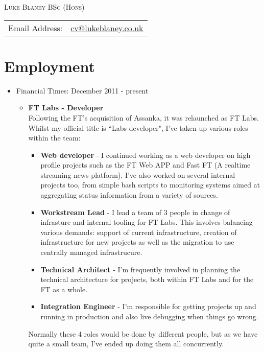 \documentclass[a4paper]{article}
\begin{document}
\begin{center}\textsc{\LARGE Luke Blaney BSc (Hons)}\end{center}

\begin{tabular}{ l l }

Email Address: & \href{mailto:cv@lukeblaney.co.uk}{cv@lukeblaney.co.uk}\\

\end{tabular}

\section*{Employment}


\begin{itemize}

\item Financial Times: December 2011 - present
\begin{itemize}\item
 {\bf FT Labs - Developer}\\
Following the FT's acquisition of Assanka, it was relaunched as FT Labs.  Whilst my official title is ``Labs developer", I've taken up various roles within the team:
	\begin{itemize}
		\item {\bf Web developer} - I continued working as a web developer on high profile projects such as the FT Web APP and Fast FT (A realtime streaming news platform).  I've also worked on several internal projects too, from simple bash scripts to monitoring systems aimed at aggregating status information from a variety of sources.
		\item {\bf Workstream Lead} - I lead a team of 3 people in change of infrasture and internal tooling for FT Labs.  This involves balancing various demands: support of current infrastructure, creation of infrastructure for new projects as well as the migration to use centrally managed infrastrucure.
		\item {\bf Technical Architect} - I'm frequently involved in planning the technical architecture for projects, both within FT Labs and for the FT as a whole.
		\item {\bf Integration Engineer} - I'm responsible for getting projects up and running in production and also live debugging when things go wrong.
	\end{itemize}
Normally these 4 roles would be done by different people, but as we have quite a small team, I've ended up doing them all concurrently.
\end{itemize}


\end{itemize}
\end{document}
